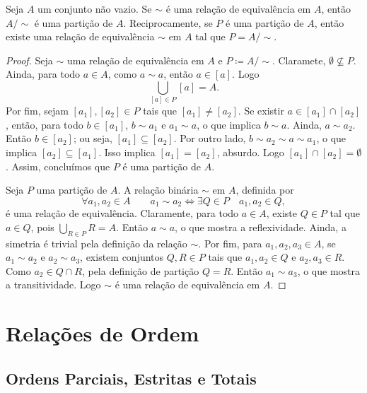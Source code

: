 \begin{teo}
\label{conj:teo.rel.equiv.part}
	Seja $A$ um conjunto não vazio. Se $\sim$ é uma relação de equivalência em $A$, então $A/\sim$ é uma partição de $A$. Reciprocamente, se $P$ é uma partição de $A$, então existe uma relação de equivalência $\sim$ em $A$ tal que $P=A/\sim$.
\end{teo}
\begin{proof}
	Seja $\sim$ uma relação de equivalência em $A$ e $P \coloneqq A/\sim$. Claramete, $\emptyset \nsubseteq P$. Ainda, para todo $a \in A$, como $a \sim a$, então $a \in [a]$. Logo
	\begin{equation*}
	\bigcup_{[a] \in P} [a] = A.
	\end{equation*}
Por fim, sejam $[a_1],[a_2] \in P$ tais que $[a_1] \neq [a_2]$. Se existir $a \in [a_1] \cap [a_2]$, então, para todo $b \in [a_1]$, $b \sim a_1$ e $a_1 \sim a$, o que implica $b \sim a$. Ainda, $a \sim a_2$. Então $b \in [a_2]$; ou seja, $[a_1] \subseteq [a_2]$. Por outro lado, $b \sim a_2 \sim a \sim a_1$, o que implica $[a_2] \subseteq [a_1]$. Isso implica $[a_1]=[a_2]$, absurdo. Logo $[a_1] \cap [a_2]=\emptyset$. Assim, concluímos que $P$ é uma partição de $A$.
	
	Seja $P$ uma partição de $A$. A relação binária $\sim$ em $A$, definida por
	\begin{equation*}
	\forall a_1,a_2 \in A \qquad a_1 \sim a_2 \Leftrightarrow \exists Q \in P \quad a_1,a_2 \in Q,
	\end{equation*}
é uma relação de equivalência. Claramente, para todo $a \in A$, existe $Q \in P$ tal que $a \in Q$, pois $\displaystyle \bigcup_{R \in P} R = A$. Então $a \sim a$, o que mostra a reflexividade. Ainda, a simetria é trivial pela definição da relação $\sim$. Por fim, para $a_1,a_2,a_3 \in A$, se $a_1 \sim a_2$ e $a_2 \sim a_3$, existem conjuntos $Q,R \in P$ tais que $a_1,a_2 \in Q$ e $a_2,a_3 \in R$. Como $a_2 \in Q \cap R$, pela definição de partição $Q=R$. Então $a_1 \sim a_3$, o que mostra a transitividade. Logo $\sim$ é uma relação de equivalência em $A$.
\end{proof}



\section{Relações de Ordem}

\subsection{Ordens Parciais, Estritas e Totais}

